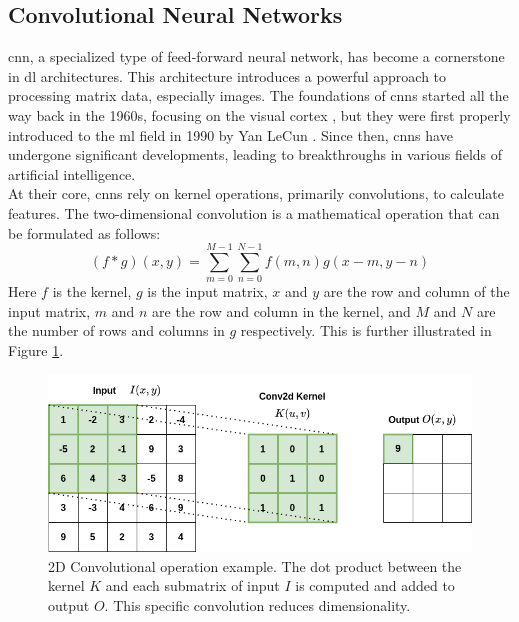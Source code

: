 \subsection{Convolutional Neural Networks}
\label{back:cnn}

\acrfull{cnn}, a specialized type of feed-forward neural network, has become a cornerstone in \acrshort{dl} architectures. This architecture introduces a powerful approach to processing matrix data, especially images.
The foundations of \acrshort{cnn}s started all the way back in the 1960s, focusing on the visual cortex \cite{hubel1962receptive}, but they were first properly introduced to the \acrshort{ml} field in 1990 by Yan LeCun \cite{NIPS1989_53c3bce6}. Since then, \acrshort{cnn}s have undergone significant developments, leading to breakthroughs in various fields of artificial intelligence. \\
%
At their core, \acrshort{cnn}s rely on kernel operations, primarily convolutions, to calculate features. The two-dimensional convolution is a mathematical operation that can be formulated as follows:
\begin{equation}
   (f * g)(x, y) = \sum_{m=0}^{M-1} \sum_{n=0}^{N-1} f(m, n)g(x-m, y-n) 
\label{eq:conv}
\end{equation}
Here $f$ is the kernel, $g$ is the input matrix, $x$ and $y$ are the row and column of the input matrix, $m$ and $n$ are the row and column in the kernel, and $M$ and $N$ are the number of rows and columns in $g$ respectively. This is further illustrated in Figure \ref{fig:2dconv}.
%
\begin{figure}[!h]
    \centering
    \includegraphics[width=0.8\linewidth]{figures/convolution.png}
    \caption{2D Convolutional operation example. The dot product between the kernel $K$ and each submatrix of input $I$ is computed and added to output $O$. This specific convolution reduces dimensionality.}
    \label{fig:2dconv}
\end{figure}
\clearpage
